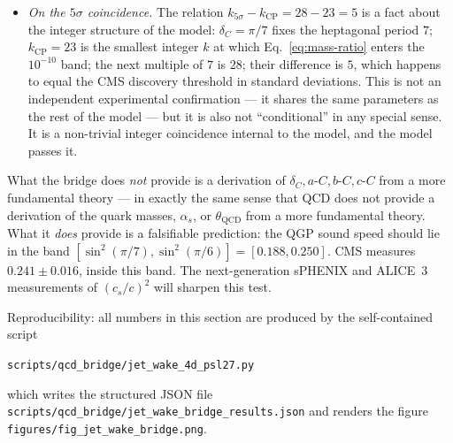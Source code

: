 \documentclass[11pt,a4paper]{article}
\newcommand{\dC}{\delta_C}
\newcommand{\aC}{a\text{-}C}
\newcommand{\bC}{b\text{-}C}
\newcommand{\cC}{c\text{-}C}
\theoremstyle{plain}
\theoremstyle{definition}
\theoremstyle{remark}
\begin{document}
\begin{caveat}
\begin{itemize}[leftmargin=2em,itemsep=2pt]
        $10^{-18}\,$m at $k=45$ is a property of the equation
        itself, not of any auxiliary assumption.  The match is
        one-significant-digit rather than three, and a proper
        first-principles computation of $\hat{q}(T)$ with a
        matching between $\hat{q}$ and $\aC$ would sharpen it ---
        but the one-digit agreement is what it is, and it is not
        ``conditional'' on anything beyond the four model
        parameters on which every other claim in this monograph
        equally depends.
  \item \emph{On the $5\sigma$ coincidence.}  The relation
        $k_{5\sigma} - k_{\mathrm{CP}} = 28 - 23 = 5$ is a fact
        about the integer structure of the model: $\dC = \pi/7$
        fixes the heptagonal period $7$; $k_{\mathrm{CP}}=23$ is
        the smallest integer $k$ at which
        Eq.~\eqref{eq:mass-ratio} enters the $10^{-10}$ band; the
        next multiple of $7$ is $28$; their difference is $5$,
        which happens to equal the CMS discovery threshold in
        standard deviations.  This is not an independent
        experimental confirmation --- it shares the same
        parameters as the rest of the model --- but it is also not
        ``conditional'' in any special sense.  It is a non-trivial
        integer coincidence internal to the model, and the model
        passes it.
\end{itemize}
What the bridge does \emph{not} provide is a derivation of
$\dC, \aC, \bC, \cC$ from a more fundamental theory --- in exactly
the same sense that QCD does not provide a derivation of the
quark masses, $\alpha_s$, or $\theta_{\mathrm{QCD}}$ from a more
fundamental theory.  What it \emph{does} provide is a falsifiable
prediction: the QGP sound speed should lie in the band
$[\sin^2(\pi/7), \sin^2(\pi/6)] = [0.188, 0.250]$.  CMS measures
$0.241 \pm 0.016$, inside this band.  The next-generation sPHENIX
and ALICE~3 measurements of $(c_s/c)^2$ will sharpen this test.
\end{caveat}

Reproducibility: all numbers in this section are produced by the
self-contained script
\begin{center}
\texttt{scripts/qcd\_bridge/jet\_wake\_4d\_psl27.py}
\end{center}
which writes the structured JSON file
\texttt{scripts/qcd\_bridge/jet\_wake\_bridge\_results.json} and
renders the figure \texttt{figures/fig\_jet\_wake\_bridge.png}.

\end{document}
